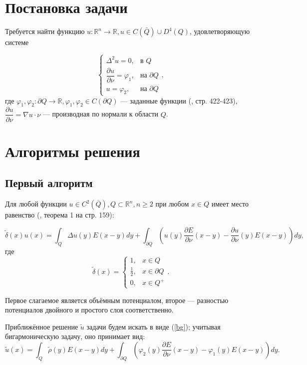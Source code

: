\documentclass[a4paper, 12pt]{article}
\newcommand{\R}[1]{\mathbb{R}^#1}
\newcommand{\der}[2]{\dfrac{\partial #1}{\partial #2}}
\begin{document}
\section{Постановка задачи}
Требуется найти функцию $u: \R{n} \rightarrow \mathbb{R}, u \in C(\bar{Q}) \cup D^4(Q)$, удовлетворяющую системе

\[
  \begin{cases}
\Delta^2 u=0, & \text{в $Q$} \\
\der{u}{\nu}=\varphi_1, & \text{на $\partial Q$}\\
u=\varphi_2, & \text{на $\partial Q$}
\end{cases},
\]
где $\varphi_1, \varphi_2: \partial Q \rightarrow \mathbb{R},\varphi_1, \varphi_2 \in C(\partial Q) $ --- заданные функции (\cite{samar}, стр. 422-423),
$\der{u}{\nu}=\nabla u \cdot \nu$ --- производная по нормали к области $Q$.

\section{Алгоритмы решения}
\subsection{Первый алгоритм}
Для любой функции $u \in C^2(\bar Q), Q \subset \R{n}, n \geq 2$
при любом $x \in Q$ имеет место равенство (\cite{mich}, теорема 1 на стр. 159):

\begin{equation}
   \tilde{\delta}(x) u(x)= \int_Q \Delta u(y) E(x-y) dy + \int_{\partial Q} \left(u(y)\der{E}{\nu}(x-y)-\der{u}{\nu}(y) E(x-y) \right) dy,
    \label{bg}
\end{equation}
где 
\[
    \tilde{\delta}(x) =
\begin{cases}
1, & x \in Q \\
\frac{1}{2}, & x \in \partial Q\\ 
0,& x \in Q^+ 
\end{cases}.
\]
  
Первое слагаемое является объёмным потенциалом, второе --- разностью потенциалов двойного и простого слоя соответственно.

Приближённое решение $\tilde{u}$ задачи будем искать в виде (\ref{bg}); учитывая бигармоническую задачу, оно принимает вид:
\begin{equation}
  \tilde{u}(x)= \int_Q \tilde{\rho}(y) E(x-y) dy + \int_{\partial Q} \left(\varphi_2(y)\der{E}{\nu}(x-y)-\varphi_1(y) E(x-y) \right) dy.
  \label{u1}
\end{equation}
\end{document}
